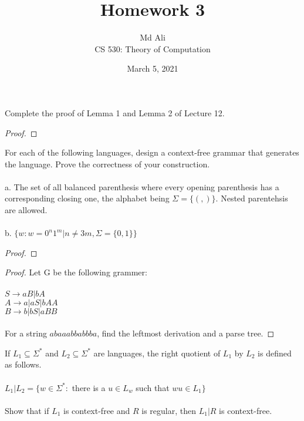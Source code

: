 \documentclass[12pt]{article}
\newenvironment{exercise}[2][Exercise]{\begin{trivlist}
\item[\hskip \labelsep {\bfseries #1}\hskip \labelsep {\bfseries #2.}]}{\end{trivlist}}
\begin{document}
 
\title{Homework 3}
\author{Md Ali \\ 
CS 530: Theory of Computation} 
\date{March 5, 2021}

\maketitle
 
\begin{exercise}{1}
Complete the proof of Lemma 1 and Lemma 2 of Lecture 12.
\end{exercise} 

\begin{proof}

\end{proof} 

\begin{exercise}{2}
For each of the following languages, design a context-free grammar that generates the language. Prove the correctness of your construction. \\ \\ 
a. The set of all balanced parenthesis where every opening parenthesis has a corresponding closing one, the alphabet being $\Sigma = \{(,)\}$. Nested parentehsis are allowed. \\ \\ 
b. $\{w: w = 0^{n}1^{m} | n \neq 3m, \Sigma = \{0, 1\} \}$
\end{exercise}
 
\begin{proof}

\end{proof}

\begin{exercise}{3}

\end{exercise}

\begin{proof}
Let G be the following grammer: \\ \\ 
$S \rightarrow aB | bA$ \\ 
$A \rightarrow a | aS | bAA$ \\ 
$B \rightarrow b | bS | aBB$ \\ \\ 
For a string $abaaabbabbba$, find the leftmost derivation and a parse tree. 
\end{proof}

\begin{exercise}{4}
If $L_{1} \subseteq \Sigma^{*}$ and $L_{2} \subseteq \Sigma^{*}$ are languages, the right quotient of $L_{1}$ by $L_{2}$ is defined as follows. \\ \\ 
$L_{1} | L_{2} = \{w \in \Sigma^{*}:$ there is a $u \in L_{w}$ such that $wu \in L_{1}\}$ \\ \\ 
Show that if $L_{1}$ is context-free and $R$ is regular, then $L_{1} | R$ is context-free.
\end{exercise}
\end{document}
